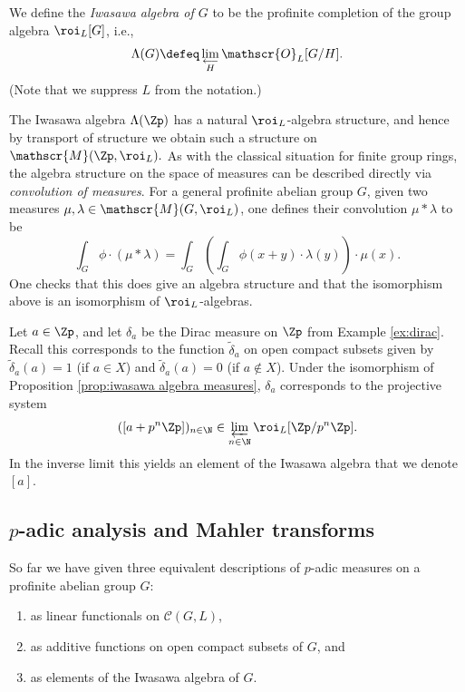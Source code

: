 \documentclass[a4paper,10pt, english, reqno]{smfart}
\numberwithin{equation}{section}
\begin{document}
\begin{definition}
We define the \emph{Iwasawa algebra of $G$}  to be the profinite completion of the group algebra $\roi_L[G]$, i.e.,
\[\Lambda(G) \defeq \lim_{\substack{\longleftarrow \\ H}} \mathscr{O}_L[G/H].\]
(Note that we suppress $L$ from the notation.)
\end{definition}


\begin{remark} \label{RemarkConvolution}
The Iwasawa algebra $\Lambda(\Zp)$ has a natural $\roi_L$-algebra structure, and hence by transport of structure we obtain such a structure on $\mathscr{M}(\Zp,\roi_L).$ As with the classical situation for finite group rings, the algebra structure on the space of measures can be described directly via \emph{convolution of measures}. For a general profinite abelian group $G$, given two measures $\mu,\lambda \in \mathscr{M}(G,\roi_L)$, one defines their convolution $\mu * \lambda$ to be
\[\int_G \phi \cdot(\mu*\lambda) = \int_G\left(\int_G \phi(x + y) \cdot \lambda(y)\right) \cdot \mu(x).\]
One checks that this does give an algebra structure and that the isomorphism above is an isomorphism of $\roi_L$-algebras.
\end{remark}


\begin{example}
Let $a \in \Zp$, and let $\delta_a$ be the Dirac measure on $\Zp$ from Example \ref{ex:dirac}. Recall this corresponds to the function $\widetilde{\delta}_a$ on open compact subsets given by $\widetilde{\delta}_a(a) = 1$ (if $a \in X$) and $\widetilde{\delta}_a(a) = 0$ (if $a \notin X$).  Under the isomorphism of Proposition \ref{prop:iwasawa algebra measures}, $\delta_a$ corresponds to the projective system 
\[
([a + p^n\Zp])_{n \in \N} \in \varprojlim_{n \in \N} \roi_L[\Zp/p^n\Zp].
\]
In the inverse limit this yields an element of the Iwasawa algebra that we denote  $[a]$.
\end{example}


\subsection{$p$-adic analysis and Mahler transforms}\label{sec:mahler}
So far we have given three equivalent descriptions of $p$-adic measures on a profinite abelian group $G$:
\begin{enumerate}
\item as linear functionals on $\mathscr{C}(G,L)$,
\item as additive functions on open compact subsets of $G$, and
\item as elements of the Iwasawa algebra of $G$.
\end{enumerate}
\end{document}
